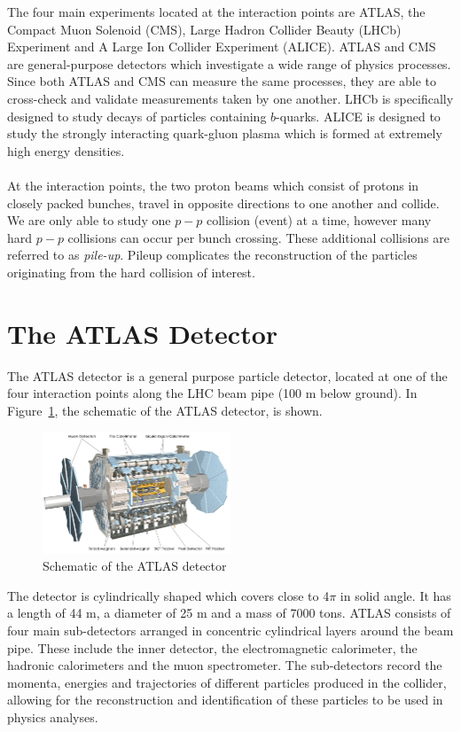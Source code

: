 The four main experiments located at the interaction points are ATLAS, the Compact Muon Solenoid (CMS), Large Hadron Collider Beauty (LHCb) Experiment and A Large Ion Collider Experiment (ALICE). ATLAS and CMS are general-purpose detectors which investigate a wide range of physics processes. Since both ATLAS and CMS can measure the same processes, they are able to cross-check and validate measurements taken by one another. LHCb is specifically designed to study decays of particles containing $b$-quarks. ALICE is designed to study the strongly interacting quark-gluon plasma which is formed at extremely high energy densities.\\\\

At the interaction points, the two proton beams which consist of protons in closely packed bunches, travel in opposite directions to one another and collide. We are only able to study one $p-p$ collision (event) at a time, however many hard $p-p$ collisions can occur per bunch crossing. These additional collisions are referred to as \textit{pile-up}. Pileup complicates the reconstruction of the particles originating from the hard collision of interest. 



\section{The ATLAS Detector}
The ATLAS detector is a general purpose particle detector, located at one of the four interaction points along the LHC beam pipe (100 m below ground). In Figure~\ref{fig:atlas-detector}, the schematic of the ATLAS detector, is shown.


\begin{figure}[h!]
 \includegraphics[width=0.5\textwidth]{figures/theoryFigs/atlasDetector.png}
\caption{Schematic of the ATLAS detector~\cite{Collaboration_2008}}
\centering
\label{fig:atlas-detector}
\end{figure}


The detector is cylindrically shaped which covers close to 4$\pi$ in solid angle. It has a length of 44 m, a diameter of 25 m and a mass of 7000 tons. ATLAS consists of four main sub-detectors arranged in concentric cylindrical layers around the beam pipe. These include the inner detector, the electromagnetic calorimeter, the hadronic calorimeters and the muon spectrometer. The sub-detectors record the momenta, energies and trajectories of different particles produced in the collider, allowing for the reconstruction and identification of these particles to be used in physics analyses.

